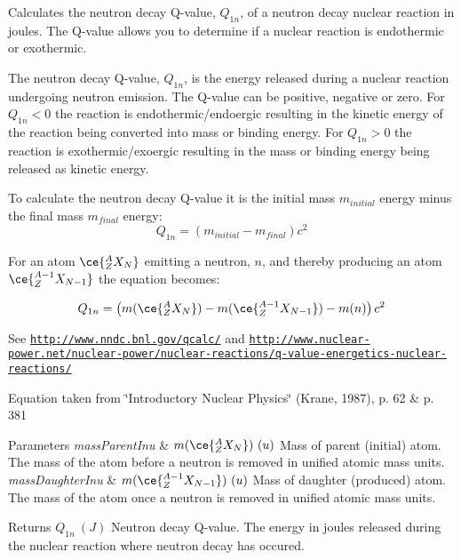 Calculates the neutron decay Q-\/value, $Q_{1n}$, of a neutron decay nuclear reaction in joules. The Q-\/value allows you to determine if a nuclear reaction is endothermic or exothermic. 

The neutron decay Q-\/value, $Q_{1n}$, is the energy released during a nuclear reaction undergoing neutron emission. The Q-\/value can be positive, negative or zero. For $Q_{1n} < 0$ the reaction is endothermic/endoergic resulting in the kinetic energy of the reaction being converted into mass or binding energy. For $Q_{1n} > 0$ the reaction is exothermic/exoergic resulting in the mass or binding energy being released as kinetic energy.

To calculate the neutron decay Q-\/value it is the initial mass $m_{initial}$ energy minus the final mass $m_{final}$ energy\+: \[Q_{1n} = \left ( m_{initial}-m_{final}\right ) c^2\]

For an atom $\ce{ ^{A}_{Z}X_{N} }$ emitting a neutron, $n$, and thereby producing an atom $\ce{ ^{A-1}_{Z}X_{N-1} }$ the equation becomes\+:

\[Q_{1n} = \left ( m(\ce{ ^{A}_{Z}X_{N} }) - m(\ce{ ^{A-1}_{Z}X_{N-1} }) - m(n) \right ) c^2\]

See \href{http://www.nndc.bnl.gov/qcalc/}{\tt http\+://www.\+nndc.\+bnl.\+gov/qcalc/} and \href{http://www.nuclear-power.net/nuclear-power/nuclear-reactions/q-value-energetics-nuclear-reactions/}{\tt http\+://www.\+nuclear-\/power.\+net/nuclear-\/power/nuclear-\/reactions/q-\/value-\/energetics-\/nuclear-\/reactions/}

Equation taken from \char`\"{}\+Introductory Nuclear Physics\char`\"{} (Krane, 1987), p. 62 \& p. 381


\begin{DoxyParams}{Parameters}
{\em mass\+Parent\+Inu} & $m(\ce{ ^{A}_{Z}X_{N} })\ (u)$ Mass of parent (initial) atom. The mass of the atom before a neutron is removed in unified atomic mass units. \\
\hline
{\em mass\+Daughter\+Inu} & $m(\ce{ ^{A-1}_{Z}X_{N-1} })\ (u)$ Mass of daughter (produced) atom. The mass of the atom once a neutron is removed in unified atomic mass units. \\
\hline
\end{DoxyParams}
\begin{DoxyReturn}{Returns}
$Q_{1n}\ (J)$ Neutron decay Q-\/value. The energy in joules released during the nuclear reaction where neutron decay has occured. 
\end{DoxyReturn}
\mbox{\label{group___q_value_gaf854b3ac07909a87f44be4e38ebb0c32}} 
